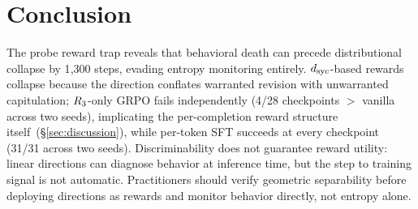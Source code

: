 \section{Conclusion}\label{sec:conclusion}

The probe reward trap reveals that behavioral death can precede distributional collapse by 1{,}300 steps, evading entropy monitoring entirely.
$d_{\text{syc}}$-based rewards collapse because the direction conflates warranted revision with unwarranted capitulation; $R_3$-only GRPO fails independently (4/28 checkpoints ${>}$ vanilla across two seeds), implicating the per-completion reward structure itself~(\S\ref{sec:discussion}), while per-token SFT succeeds at every checkpoint (31/31 across two seeds).
Discriminability does not guarantee reward utility: linear directions can diagnose behavior at inference time, but the step to training signal is not automatic.
Practitioners should verify geometric separability before deploying directions as rewards and monitor behavior directly, not entropy alone.
